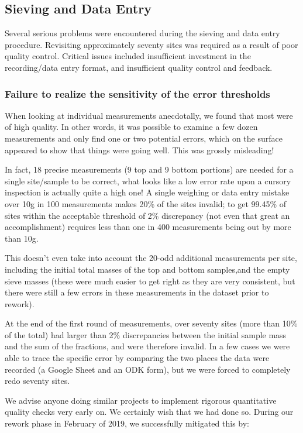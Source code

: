 \documentclass[a4paper,12pt,twoside]{article}
\begin{document}
\color{RHblue}
\subsection{Sieving and Data Entry}

\color{RHgrey}
Several serious problems were encountered during the sieving and data entry procedure. Revisiting approximately seventy sites was required as a result of poor quality control. Critical issues included insufficient investment in the recording/data entry format, and insufficient quality control and feedback.

\color{RHblue}
\subsubsection{Failure to realize the sensitivity of the error thresholds}
\color{RHgrey}
When looking at individual measurements anecdotally, we found that most were of high quality. In other words, it was possible to examine a few dozen measurements and only find one or two potential errors, which on the surface appeared to show that things were going well. This was grossly misleading!

In fact, 18 precise measurements (9 top and 9 bottom portions) are needed for a single site/sample to be correct, what looks like a low error rate upon a cursory inspection is actually quite a high one! A single weighing or data entry mistake over 10g in 100 measurements makes 20\% of the sites invalid; to get 99.45\% of sites within the acceptable threshold of 2\% discrepancy (not even that great an accomplishment) requires less than one in 400 measurements being out by more than 10g. 

This doesn't even take into account the 20-odd additional measurements per site, including the initial total masses of the top and bottom samples,and the empty sieve masses (these were much easier to get right as they are very consistent, but there were still a few errors in these measurements in the dataset prior to rework).

At the end of the first round of measurements, over seventy sites (more than 10\% of the total) had larger than 2\% discrepancies between the initial sample mass and the sum of the fractions, and were therefore invalid. In a few cases we were able to trace the specific error by comparing the two places the data were recorded (a Google Sheet and an ODK form), but we were forced to completely redo seventy sites.

We advise anyone doing similar projects to implement rigorous quantitative quality checks very early on. We certainly wish that we had done so. During our rework phase in February of 2019, we successfully mitigated this by:
\end{document}
